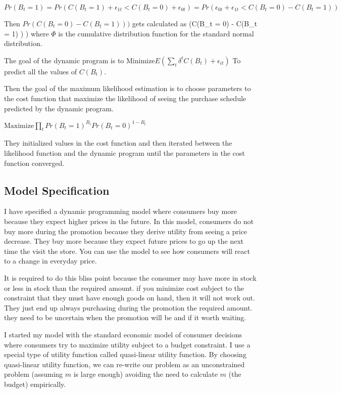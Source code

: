 \documentclass{article}
\begin{document}
$Pr(B_t=1) = Pr(C(B_t = 1) + \epsilon_{1t} < C(B_t = 0) + \epsilon_{0t} ) =  Pr(  \epsilon_{0t} + \epsilon_{1t} < C(B_t = 0) - C(B_t = 1) )   $

Then $Pr(C(B_t = 0) - C(B_t = 1) ) )$ gets calculated as \Phi(C(B_t = 0) - C(B_t = 1) ) ) where $\Phi$ is the cumulative distribution function for the standard normal distribution.

The goal of the dynamic program is to 
$\text{Minimize} E( \sum_t \delta^{t} C(B_t) + \epsilon_{it} )$
To predict all the values of $C(B_t)$.

Then the goal of the maximum likelihood estimation is to choose parameters to the cost function that maximize the likelihood of seeing the purchase schedule predicted by the dynamic program. 

$\text{Maximize} \prod_{t} Pr({B_t= 1})^{B_t} Pr(B_t=0)^{1-B_t} $

They initialized values in the cost function and then iterated between the likelihood function and the dynamic program until the parameters in the cost function converged.

\subsection{Model Specification}

I have specified a dynamic programming model where consumers buy more because they expect higher prices in the future. In this model, consumers do not buy more during the promotion because they derive utility from seeing a price decrease. They buy more because they expect future prices to go up the next time the visit the store. You can use the model to see how consumers will react to a change in everyday price.

It is required to do this bliss point because the consumer may have more in stock or less in stock than the required amount. if you minimize cost subject to the constraint that they must have enough goods on hand, then it will not work out. They just end up always purchasing during the promotion the required amount. they need to be uncertain when the promotion will be and if it worth waiting.


I started my model with the standard economic model of consumer decisions where consumers try to maximize utility subject to a budget constraint. I use a special type of utility function called quasi-linear utility function. By choosing quasi-linear utility function, we can re-write our problem as an unconstrained problem (assuming $m$ is large enough) avoiding the need to calculate $m$ (the budget) empirically. 
\end{document}
